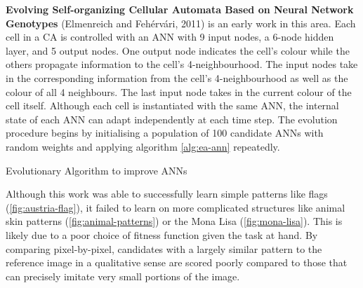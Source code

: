 \noindent
\textbf{Evolving Self-organizing Cellular Automata Based on Neural Network Genotypes} (Elmenreich and Feh\'erv\'ari, 2011) \cite{elmenreich2011evolving} is an early work in this area.
Each cell in a CA is controlled with an ANN with 9 input nodes, a 6-node hidden layer, and 5 output nodes.
One output node indicates the cell's colour while the others propagate information to the cell's 4-neighbourhood.
The input nodes take in the corresponding information from the cell's 4-neighbourhood as well as the colour of all 4 neighbours.
The last input node takes in the current colour of the cell itself.
Although each cell is instantiated with the same ANN, the internal state of each ANN can adapt independently at each time step.
The evolution procedure begins by initialising a population of 100 candidate ANNs with random weights and applying algorithm \ref{alg:ea-ann} repeatedly. 
\begin{algorithm}
\caption{Evolutionary Algorithm to improve ANNs}
\label{alg:ea-ann}
\begin{algorithmic}
\EndFor
{}
\EndFor
\end{algorithmic}
\end{algorithm}

Although this work was able to successfully learn simple patterns like flags (\ref{fig:austria-flag}), it failed to learn on more complicated structures like animal skin patterns (\ref{fig:animal-patterns}) or the Mona Lisa (\ref{fig:mona-lisa}).
This is likely due to a poor choice of fitness function given the task at hand.
By comparing pixel-by-pixel, candidates with a largely similar pattern to the reference image in a qualitative sense are scored poorly compared to those that can precisely imitate very small portions of the image.\\

